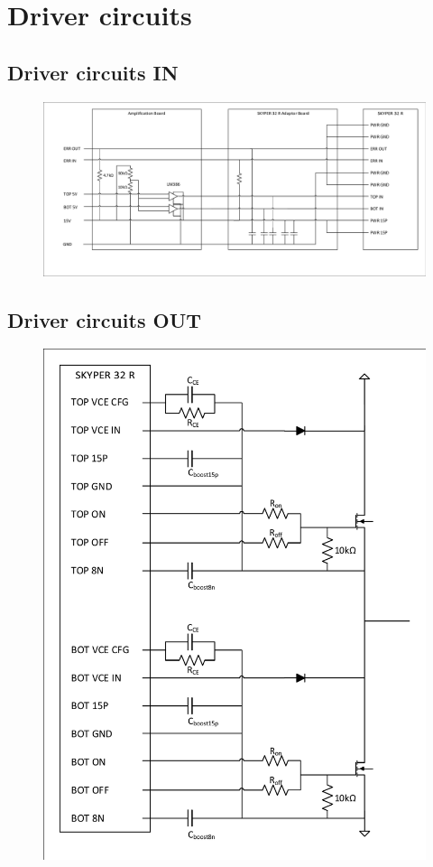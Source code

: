 \chapter{Driver circuits}
\label{app:DRIVER}
\vspace{-8mm}
\section{Driver circuits IN}
\begin{figure}[H]
	\centering
	\includegraphics[width = 0.7\textheight, keepaspectratio, angle = 270]{figures/Skyperboard/Skyper32in.pdf}
\end{figure}
\clearpage 
\section{Driver circuits OUT}
\begin{figure}[H]
	\centering
	\includegraphics[height = 0.85\textheight, keepaspectratio,]{figures/Skyperboard/Skyper32out.pdf}
\end{figure}
